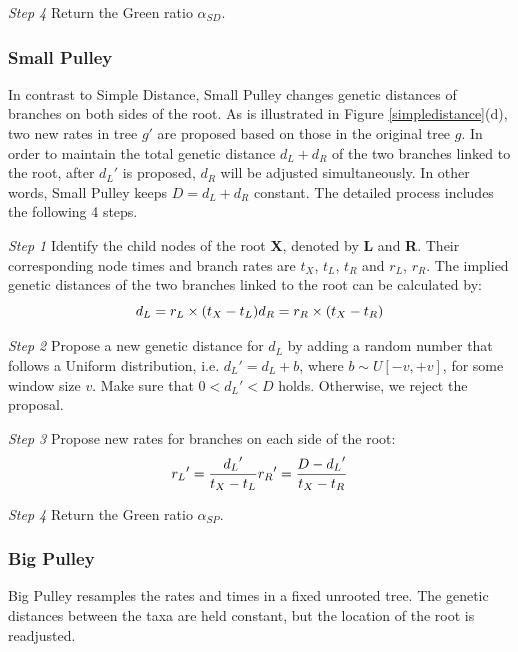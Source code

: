 \documentclass{bmcart}
\begin{document}
\emph{Step 4} Return the Green ratio ${\alpha_{SD}}$.
\subsubsection*{Small Pulley}
In contrast to Simple Distance, Small Pulley changes genetic distances of branches on both sides of the root. As is illustrated in Figure \ref{simpledistance}(d), two new rates in tree ${g}'$ are proposed based on those in the original tree $g$. In order to maintain the total genetic distance $d_L + d_R$ of the two branches linked to the root, after ${d_L}'$ is proposed, $d_R$ will be adjusted simultaneously. In other words, Small Pulley keeps $D = d_L + d_R$ constant. The detailed process includes the following 4 steps.

\emph{Step 1} Identify the child nodes of the root \textbf{X}, denoted by \textbf{L} and \textbf{R}. Their corresponding node times and branch rates are $t_X$, $t_L$, $t_R$ and $r_L$, $r_R$. The implied genetic distances of the two branches linked to the root can be calculated by:
\begin{equation}
\label{sma1_dis}
{d_L} = {r_L} \times ({{t_X} - {t_L}})\\
{d_R} = {r_R} \times ({{t_X} - {t_R}})
 \end{equation}

\emph{Step 2} Propose a new genetic distance for $d_L$ by adding a random number that follows a Uniform distribution, i.e.  ${d_L}' = {d_L} + b$, where $b \sim U[ - v, + v]$, for some window size $v$. Make sure that $0 < {d_L}' < D$ holds. Otherwise, we reject the proposal.

\emph{Step 3} Propose new rates for branches on each side of the root:
\begin{equation}
\label{sma1_rate}
{r_L}' = \frac{{{d_L}'}}{{{t_X} - {t_L}}}\\
{r_R}' = \frac{{D - {d_L}'}}{{{t_X} - {t_R}}}
 \end{equation}

\emph{Step 4} Return the Green ratio ${\alpha_{SP}}$.
\subsubsection*{Big Pulley}
Big Pulley resamples the rates and times in a fixed unrooted tree. The genetic distances between the taxa are held constant, but the location of the root is readjusted.
\end{document}
